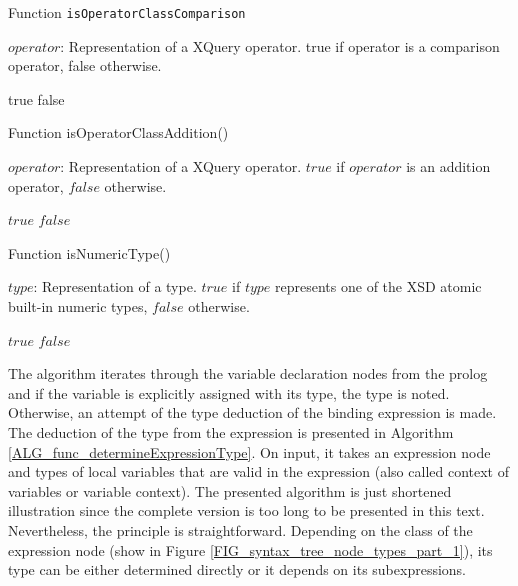 \begin{algorithm}
\caption{Function \texttt{isOperatorClassComparison}}
\label{ALG_func_isOperatorClassComparison}
\begin{algorithmic}[1]
\REQUIRE $operator$: Representation of a XQuery operator.
\ENSURE true if operator is a comparison operator, false otherwise.

    \RETURN true
\ELSE
    \RETURN false
\ENDIF
\end{algorithmic}
\end{algorithm}

\begin{algorithm}
\caption{Function isOperatorClassAddition()}
\label{ALG_func_isOperatorClassAddition}
\begin{algorithmic}[1]
\REQUIRE $operator$: Representation of a XQuery operator.
\ENSURE $true$ if $operator$ is an addition operator, $false$ otherwise.

    \RETURN $true$
\ELSE
    \RETURN $false$
\ENDIF
\end{algorithmic}
\end{algorithm}

\begin{algorithm}
\caption{Function isNumericType()}
\label{ALG_func_isNumericType}
\begin{algorithmic}[1]
\REQUIRE $type$: Representation of a type.
\ENSURE $true$ if $type$ represents one of the XSD atomic built-in numeric types, $false$ otherwise.

    \RETURN $true$
\ELSE
    \RETURN $false$
\ENDIF
\end{algorithmic}
\end{algorithm}

The algorithm iterates through the variable declaration nodes from the prolog and if the variable is explicitly assigned with its type, the type is noted. Otherwise, an attempt of the type deduction of the binding expression is made. The deduction of the type from the expression is presented in Algorithm \ref{ALG_func_determineExpressionType}. On input, it takes an expression node and types of local variables that are valid in the expression (also called context of variables or variable context). The presented algorithm is just shortened illustration since the complete version is too long to be presented in this text. Nevertheless, the principle is straightforward. Depending on the class of the expression node (show in Figure \ref{FIG_syntax_tree_node_types_part_1}), its type can be either determined directly or it depends on its subexpressions.

